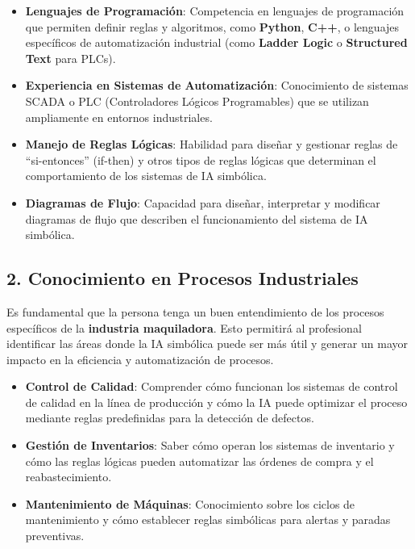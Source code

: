 \documentclass[
  10pt,
  letterpaper,
]{book}
\providecommand{\tightlist}{%
  \setlength{\itemsep}{0pt}\setlength{\parskip}{0pt}}\usepackage{longtable,booktabs,array}
\begin{document}
\begin{itemize}
\tightlist
\item
  \textbf{Lenguajes de Programación}: Competencia en lenguajes de
  programación que permiten definir reglas y algoritmos, como
  \textbf{Python}, \textbf{C++}, o lenguajes específicos de
  automatización industrial (como \textbf{Ladder Logic} o
  \textbf{Structured Text} para PLCs).
\item
  \textbf{Experiencia en Sistemas de Automatización}: Conocimiento de
  sistemas SCADA o PLC (Controladores Lógicos Programables) que se
  utilizan ampliamente en entornos industriales.
\item
  \textbf{Manejo de Reglas Lógicas}: Habilidad para diseñar y gestionar
  reglas de ``si-entonces'' (if-then) y otros tipos de reglas lógicas
  que determinan el comportamiento de los sistemas de IA simbólica.
\item
  \textbf{Diagramas de Flujo}: Capacidad para diseñar, interpretar y
  modificar diagramas de flujo que describen el funcionamiento del
  sistema de IA simbólica.
\end{itemize}

\subsection{\texorpdfstring{\textbf{2. Conocimiento en Procesos
Industriales}}{2. Conocimiento en Procesos Industriales}}\label{conocimiento-en-procesos-industriales}

Es fundamental que la persona tenga un buen entendimiento de los
procesos específicos de la \textbf{industria maquiladora}. Esto
permitirá al profesional identificar las áreas donde la IA simbólica
puede ser más útil y generar un mayor impacto en la eficiencia y
automatización de procesos.

\begin{itemize}
\tightlist
\item
  \textbf{Control de Calidad}: Comprender cómo funcionan los sistemas de
  control de calidad en la línea de producción y cómo la IA puede
  optimizar el proceso mediante reglas predefinidas para la detección de
  defectos.
\item
  \textbf{Gestión de Inventarios}: Saber cómo operan los sistemas de
  inventario y cómo las reglas lógicas pueden automatizar las órdenes de
  compra y el reabastecimiento.
\item
  \textbf{Mantenimiento de Máquinas}: Conocimiento sobre los ciclos de
  mantenimiento y cómo establecer reglas simbólicas para alertas y
  paradas preventivas.
\end{itemize}
\end{document}
